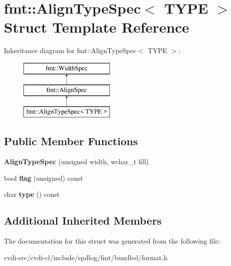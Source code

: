 \hypertarget{structfmt_1_1AlignTypeSpec}{}\section{fmt\+:\+:Align\+Type\+Spec$<$ T\+Y\+PE $>$ Struct Template Reference}
\label{structfmt_1_1AlignTypeSpec}
Inheritance diagram for fmt\+:\+:Align\+Type\+Spec$<$ T\+Y\+PE $>$\+:\begin{figure}[H]
\begin{center}
\leavevmode
\includegraphics[height=3.000000cm]{structfmt_1_1AlignTypeSpec}
\end{center}
\end{figure}
\subsection*{Public Member Functions}
\begin{DoxyCompactItemize}
\item 
{\bfseries Align\+Type\+Spec} (unsigned width, wchar\+\_\+t fill)\hypertarget{structfmt_1_1AlignTypeSpec_a8140ef8fb8153a445ab7975fa2c30525}{}\label{structfmt_1_1AlignTypeSpec_a8140ef8fb8153a445ab7975fa2c30525}

\item 
bool {\bfseries flag} (unsigned) const \hypertarget{structfmt_1_1AlignTypeSpec_a20ab6ad809a76ea55d6f118526c25112}{}\label{structfmt_1_1AlignTypeSpec_a20ab6ad809a76ea55d6f118526c25112}

\item 
char {\bfseries type} () const \hypertarget{structfmt_1_1AlignTypeSpec_a15b451abb3309bcca720895faa320fe3}{}\label{structfmt_1_1AlignTypeSpec_a15b451abb3309bcca720895faa320fe3}

\end{DoxyCompactItemize}
\subsection*{Additional Inherited Members}


The documentation for this struct was generated from the following file\+:\begin{DoxyCompactItemize}
\item 
cvdi-\/src/cvdi-\/cl/include/spdlog/fmt/bundled/format.\+h\end{DoxyCompactItemize}
